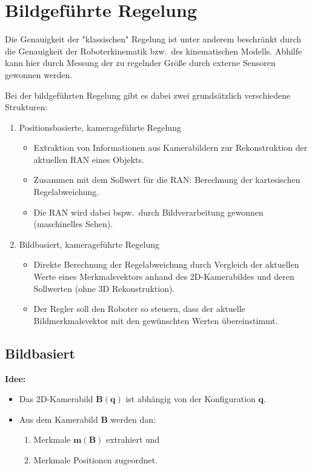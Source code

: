 \documentclass[a4paper, 11pt, accentcolor = tud3b]{tudreport}
\newcommand{\mat}[1]{\boldsymbol{#1}}
\renewcommand{\vec}[1]{\boldsymbol{\mathbf{#1}}}
\newcommand{\bzw}{bzw.~}
\newcommand{\bspw}{bspw.~}
\begin{document}
		\section{Bildgeführte Regelung}
			Die Genauigkeit der "klassischen" Regelung ist unter anderem beschränkt durch die Genauigkeit der Roboterkinematik \bzw des kinematischen Modells. Abhilfe kann hier durch Messung der zu regelnder Größe durch externe Sensoren gewonnen werden.
			
			Bei der bildgeführten Regelung gibt es dabei zwei grundsätzlich verschiedene Strukturen:
			\begin{enumerate}
				\item Positionsbasierte, kamerageführte Regelung
					\begin{itemize}
						\item Extraktion von Informationen aus Kamerabildern zur Rekonstruktion der aktuellen RAN eines Objekts.
						\item Zusammen mit dem Sollwert für die RAN: Berechnung der kartesischen Regelabweichung.
						\item Die RAN wird dabei \bspw durch Bildverarbeitung gewonnen (maschinelles Sehen).
					\end{itemize}
				\item Bildbasiert, kamerageführte Regelung
					\begin{itemize}
						\item Direkte Berechnung der Regelabweichung durch Vergleich der aktuellen Werte eines Merkmalsvektors anhand des 2D-Kamerabildes und deren Sollwerten (ohne 3D Rekonstruktion).
						\item Der Regler soll den Roboter so steuern, dass der aktuelle Bildmerkmalsvektor mit den gewünschten Werten übereinstimmt.
					\end{itemize}
			\end{enumerate}

			\subsection{Bildbasiert}
				\textbf{Idee:}
				\begin{itemize}
					\item Das 2D-Kamerabild \( \mat{B}(\vec{q}) \) ist abhängig von der Konfiguration \( \vec{q} \).
					\item Aus dem Kamerabild \( \mat{B} \) werden dan:
						\begin{enumerate}
							\item Merkmale \( \vec{m}(\mat{B}) \) extrahiert und
							\item Merkmale Positionen zugeordnet.
						\end{enumerate}
				\end{itemize}
			
\end{document}
